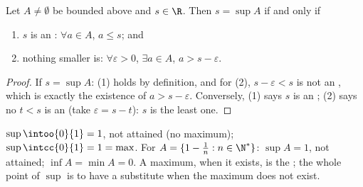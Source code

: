 \begin{proposition}\label{prop:b1:reals:epsilon}
Let $A \neq \emptyset$ be bounded above and $s \in \R$. Then $s =
\sup A$ if and only if
\begin{enumerate}
  \item $s$ is an : $\forall a \in A$, $a \leq s$; and
  \item nothing smaller is: $\forall \varepsilon > 0$, $\exists a \in
        A$, $a > s - \varepsilon$.
\end{enumerate}
\end{proposition}

\begin{proof}
If $s = \sup A$: (1) holds by definition, and for (2), $s -
\varepsilon < s$ is not an , which is exactly the
existence of $a > s - \varepsilon$. Conversely, (1) says $s$ is an
; (2) says no $t < s$ is an  (take $\varepsilon
= s - t$): $s$ is the least one.
\end{proof}

\begin{example}\label{ex:b1:reals:supexamples}
$\sup \intoo{0}{1} = 1$, not attained (no maximum);
$\sup \intcc{0}{1} = 1 = \max$. For $A = \{1 - \frac 1n : n \in
\N^*\}$: $\sup A = 1$, not attained; $\inf A = \min A = 0$. A maximum,
when it exists, is the ; the whole point of $\sup$ is to have
a substitute when the maximum does not exist.
\end{example}

